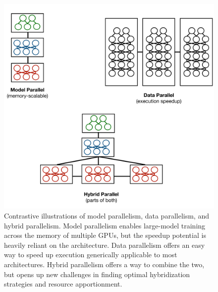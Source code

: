 \begin{figure}[th!]
\centering
	\includegraphics[keepaspectratio=true, width=0.9\linewidth]{images/mp_vs_dp_vs_hp}
	\caption{Contrastive illustrations of model parallelism, data parallelism, and hybrid parallelism. Model parallelism enables large-model training across the memory of multiple GPUs, but the speedup potential is heavily reliant on the architecture. Data parallelism offers an easy way to speed up execution generically applicable to most architectures. Hybrid parallelism offers a way to combine the two, but opens up new challenges in finding optimal hybridization strategies and resource apportionment.}
	\label{fig:hybrid_parallel_comparison}
\end{figure}


















